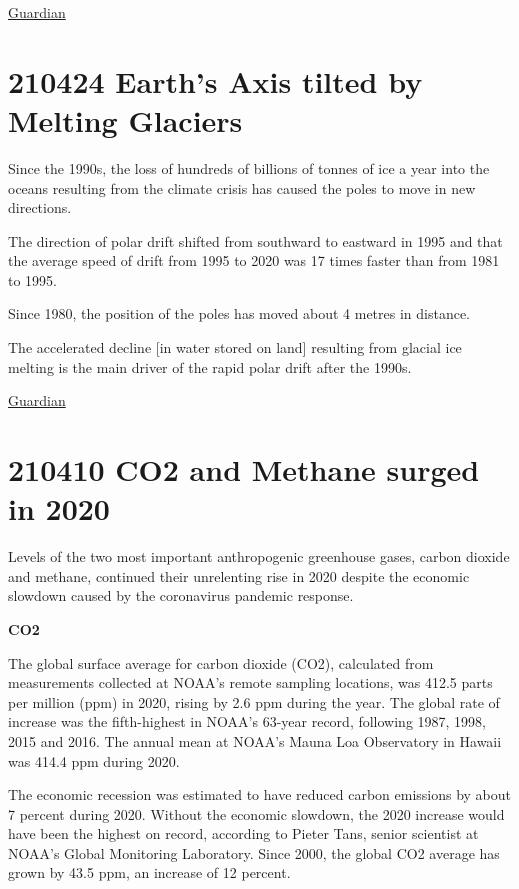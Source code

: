 \documentclass[
]{book}
\begin{document}
\href{https://www.theguardian.com/environment/2021/may/07/the-young-people-taking-their-countries-to-court-over-climate-inaction}{Guardian}

\hypertarget{earths-axis-tilted-by-melting-glaciers}{%
\section{210424 Earth's Axis tilted by Melting Glaciers}\label{earths-axis-tilted-by-melting-glaciers}}

Since the 1990s, the loss of hundreds of billions of tonnes of ice a year into the oceans resulting from the climate crisis has caused the poles to move in new directions.

The direction of polar drift shifted from southward to eastward in 1995 and that the average speed of drift from 1995 to 2020 was 17 times faster than from 1981 to 1995.

Since 1980, the position of the poles has moved about 4 metres in distance.

The accelerated decline {[}in water stored on land{]} resulting from glacial ice melting is the main driver of the rapid polar drift after the 1990s.

\href{https://www.theguardian.com/environment/2021/apr/23/climate-crisis-has-shifted-the-earths-axis-study-shows}{Guardian}

\hypertarget{co2-and-methane-surged-in-2020}{%
\section{210410 CO2 and Methane surged in 2020}\label{co2-and-methane-surged-in-2020}}

Levels of the two most important anthropogenic greenhouse gases, carbon dioxide and methane, continued their unrelenting rise in 2020 despite the economic slowdown caused by the coronavirus pandemic response.

\textbf{CO2}

The global surface average for carbon dioxide (CO2), calculated from measurements collected at NOAA's remote sampling locations, was 412.5 parts per million (ppm) in 2020, rising by 2.6 ppm during the year. The global rate of increase was the fifth-highest in NOAA's 63-year record, following 1987, 1998, 2015 and 2016. The annual mean at NOAA's Mauna Loa Observatory in Hawaii was 414.4 ppm during 2020.

The economic recession was estimated to have reduced carbon emissions by about 7 percent during 2020. Without the economic slowdown, the 2020 increase would have been the highest on record, according to Pieter Tans, senior scientist at NOAA's Global Monitoring Laboratory. Since 2000, the global CO2 average has grown by 43.5 ppm, an increase of 12 percent.
\end{document}
